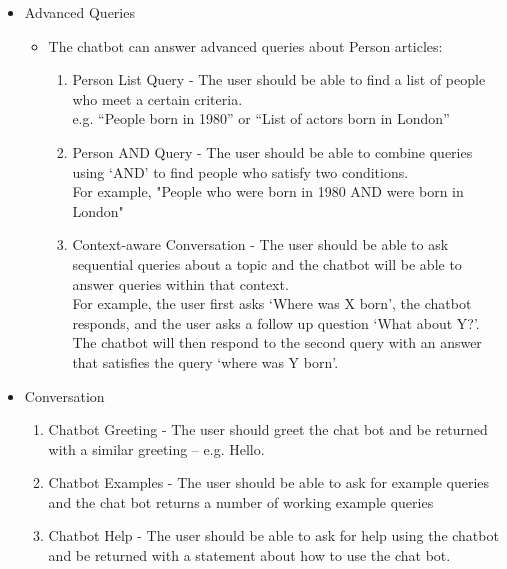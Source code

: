 \begin{itemize}
\begin{itemize}
\begin{enumerate}[resume*]
		\end{enumerate}
	\end{itemize}
	\item Advanced Queries
	\begin{itemize}
		\item The chatbot can answer advanced queries about Person articles:
		\begin{enumerate}[resume*]
			\item Person List Query - The user should be able to find a list of people who meet a certain criteria. \\
			e.g. ``People born in 1980'' or ``List of actors born in London''
			\item Person AND Query - The user should be able to combine queries using ‘AND’ to find people who satisfy two conditions. \\For example, "People who were born in 1980 AND were born in London"
			\item Context-aware Conversation - The user should be able to ask sequential queries about a topic and the chatbot will be able to answer queries within that context. \\ For example, the user first asks ‘Where was X born’, the chatbot responds, and the user asks a follow up question ‘What about Y?’. The chatbot will then respond to the second query with an answer that satisfies the query ‘where was Y born’.
		\end{enumerate}
	\end{itemize}
	\item Conversation
	\begin{enumerate}[resume*]
		\item Chatbot Greeting - The user should greet the chat bot and be returned with a similar greeting – e.g. Hello.
		\item Chatbot Examples - The user should be able to ask for example queries and the chat bot returns a number of working example queries
		\item Chatbot Help - The user should be able to ask for help using the chatbot and be returned with a statement about how to use the chat bot.
	\end{enumerate}
\end{itemize}

